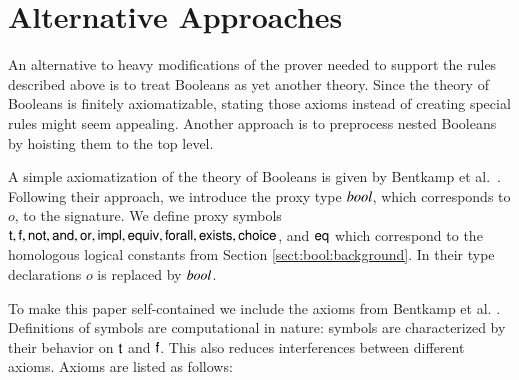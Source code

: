 \section{Alternative Approaches} 
\label{sect:bool:alternative}

An alternative to heavy modifications of the prover needed to support the rules
described above is to treat Booleans as yet another theory. Since the theory of Booleans
is finitely axiomatizable, stating those axioms instead of creating special
rules might seem appealing. Another approach
is to preprocess nested Booleans by hoisting them to the top level.

A simple axiomatization of the theory of Booleans is given by Bentkamp et al.\ \cite{bbtvw-21-sup-lam}.
Following their approach, we introduce the proxy type ${\mathit{bool}}$, which corresponds to $o$, to the
signature. We define proxy symbols $\mathsf{t}, \mathsf{f}, \mathsf{not}, \mathsf{and}, \mathsf{or},
\mathsf{impl}, \mathsf{equiv},\allowbreak \mathsf{forall}, \mathsf{exists}, \mathsf{choice}$, and $\mathsf{eq}$ which 
correspond to the homologous logical constants from Section \ref{sect:bool:background}. In their
type declarations $o$ is replaced by ${\mathit{bool}}$.
  
To make this paper self-contained we include the axioms from Bentkamp et al. \cite{bbtvw-21-sup-lam}.
Definitions of symbols are computational in nature: symbols are characterized by their behavior on $\mathsf{t}$ and $\mathsf{f}$.
This also reduces interferences between different axioms. Axioms are listed as follows:

\kern\abovedisplayskip
 
